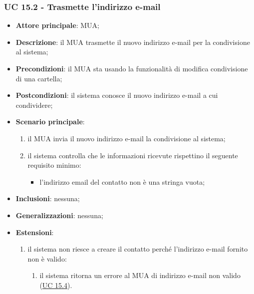     \subsubsection{UC 15.2 - Trasmette l'indirizzo e-mail} \label{sec:UC15.2}
    \begin{itemize}
        \item \textbf{Attore principale}: MUA;
        \item \textbf{Descrizione}: il MUA trasmette il nuovo indirizzo e-mail per la condivisione al sistema;
        \item \textbf{Precondizioni}: il MUA sta usando la funzionalità di modifica condivisione di una cartella;
        \item \textbf{Postcondizioni}: il sistema conosce il nuovo indirizzo e-mail a cui condividere;
        \item \textbf{Scenario principale}:
            \begin{enumerate}
                \item il MUA invia il nuovo indirizzo e-mail la condivisione al sistema;
                \item il sistema controlla che le informazioni ricevute rispettino il seguente requisito minimo:
                    \begin{itemize}
                        \item l'indirizzo email del contatto non è una stringa vuota;
                    \end{itemize}
            \end{enumerate}
        \item \textbf{Inclusioni}: nessuna;
        \item \textbf{Generalizzazioni}: nessuna;
        \item \textbf{Estensioni}:
            \begin{enumerate}[label=\alph*.]
                \item il sistema non riesce a creare il contatto perché l'indirizzo e-mail fornito non è valido:
                \begin{enumerate}[label=\arabic*.]
                    \item il sistema ritorna un errore al MUA di indirizzo e-mail non valido (\hyperref[sec:UC15.4]{UC 15.4}).
                \end{enumerate}
            \end{enumerate}
    \end{itemize}


